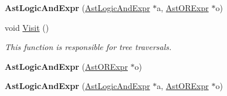 \begin{DoxyCompactItemize}
\item 
\hypertarget{classAstLogicAndExpr_a522ff78d2ca7bf2a3882ad6872b9f1e4}{{\bfseries Ast\-Logic\-And\-Expr} (\hyperlink{classAstLogicAndExpr}{Ast\-Logic\-And\-Expr} $\ast$a, \hyperlink{classAstORExpr}{Ast\-O\-R\-Expr} $\ast$o)}\label{classAstLogicAndExpr_a522ff78d2ca7bf2a3882ad6872b9f1e4}

\item 
void \hyperlink{classAstLogicAndExpr_a4fc66df5e58e7bea73a712986e94ddcf}{Visit} ()
\begin{DoxyCompactList}\small\item\em This function is responsible for tree traversals. \end{DoxyCompactList}\item 
\hypertarget{classAstLogicAndExpr_a7c71466f3ec88e35ac925d7d69fe5e3b}{{\bfseries Ast\-Logic\-And\-Expr} (\hyperlink{classAstORExpr}{Ast\-O\-R\-Expr} $\ast$o)}\label{classAstLogicAndExpr_a7c71466f3ec88e35ac925d7d69fe5e3b}

\item 
\hypertarget{classAstLogicAndExpr_a522ff78d2ca7bf2a3882ad6872b9f1e4}{{\bfseries Ast\-Logic\-And\-Expr} (\hyperlink{classAstLogicAndExpr}{Ast\-Logic\-And\-Expr} $\ast$a, \hyperlink{classAstORExpr}{Ast\-O\-R\-Expr} $\ast$o)}\label{classAstLogicAndExpr_a522ff78d2ca7bf2a3882ad6872b9f1e4}


\end{DoxyCompactItemize}
